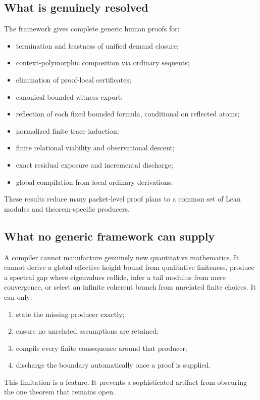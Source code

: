 \normalsize

\subsection{What is genuinely resolved}

The framework gives complete generic human proofs for:
\begin{itemize}
  \item termination and leastness of unified demand closure;
  \item context-polymorphic composition via ordinary sequents;
  \item elimination of proof-local certificates;
  \item canonical bounded witness export;
  \item reflection of each fixed bounded formula, conditional on reflected
        atoms;
  \item normalized finite trace induction;
  \item finite relational viability and observational descent;
  \item exact residual exposure and incremental discharge;
  \item global compilation from local ordinary derivations.
\end{itemize}
These results reduce many packet-level proof plans to a common set of Lean
modules and theorem-specific producers.

\subsection{What no generic framework can supply}

A compiler cannot manufacture genuinely new quantitative mathematics.  It
cannot derive a global effective height bound from qualitative finiteness,
produce a spectral gap where eigenvalues collide, infer a tail modulus from
mere convergence, or select an infinite coherent branch from unrelated finite
choices.  It can only:
\begin{enumerate}
  \item state the missing producer exactly;
  \item ensure no unrelated assumptions are retained;
  \item compile every finite consequence around that producer;
  \item discharge the boundary automatically once a proof is supplied.
\end{enumerate}
This limitation is a feature.  It prevents a sophisticated artifact from
obscuring the one theorem that remains open.

